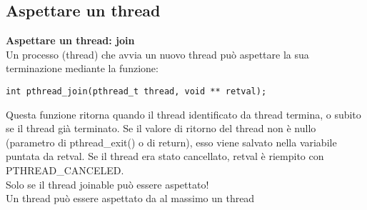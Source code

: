 \begin{flushleft}
  \subsection{Aspettare un thread}
  \begin{flushleft}
    \textbf{Aspettare un thread: join}\\
    Un processo (thread) che avvia un nuovo thread può aspettare la sua terminazione 
    mediante la funzione: 
    \begin{flushleft}
      \texttt{int pthread\_join(pthread\_t thread, void ** retval);}
    \end{flushleft}
    Questa funzione ritorna quando il thread identificato da thread termina, o subito 
    se il thread \ace già terminato. Se il valore di ritorno del thread non è nullo (parametro 
    di pthread\_exit() o di return), esso viene salvato nella variabile puntata da 
    retval. Se il thread era stato cancellato, retval è riempito con PTHREAD\_CANCELED.\\
    Solo se il thread \ace joinable può essere aspettato! \\
    Un thread può essere aspettato da al massimo un thread
  \end{flushleft}

\end{flushleft}
